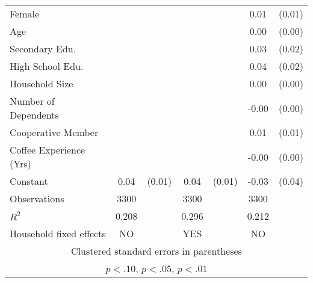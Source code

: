\begin{table}[htbp]
\begin{tabular}{l*{3}{cc}}
Female          &                  &         &                  &         &     0.01         &   (0.01)\\
Age             &                  &         &                  &         &     0.00\sym{***}&   (0.00)\\
Secondary Edu.  &                  &         &                  &         &     0.03         &   (0.02)\\
High School Edu.&                  &         &                  &         &     0.04\sym{*}  &   (0.02)\\
Household Size  &                  &         &                  &         &     0.00         &   (0.00)\\
Number of Dependents&                  &         &                  &         &    -0.00\sym{*}  &   (0.00)\\
Cooperative Member&                  &         &                  &         &     0.01         &   (0.01)\\
Coffee Experience (Yrs)&                  &         &                  &         &    -0.00\sym{*}  &   (0.00)\\
Constant        &     0.04\sym{***}&   (0.01)&     0.04\sym{***}&   (0.01)&    -0.03         &   (0.04)\\
\midrule
Observations    &     3300         &         &     3300         &         &     3300         &         \\
\(R^{2}\)       &    0.208         &         &    0.296         &         &    0.212         &         \\
Household fixed effects&       NO         &         &      YES         &         &       NO         &         \\
\bottomrule
\multicolumn{7}{c}{\footnotesize Clustered standard errors in parentheses}\\
\multicolumn{7}{c}{\footnotesize \sym{*} \(p<.10\), \sym{**} \(p<.05\), \sym{***} \(p<.01\)}\\
\end{tabular}
\end{table}
